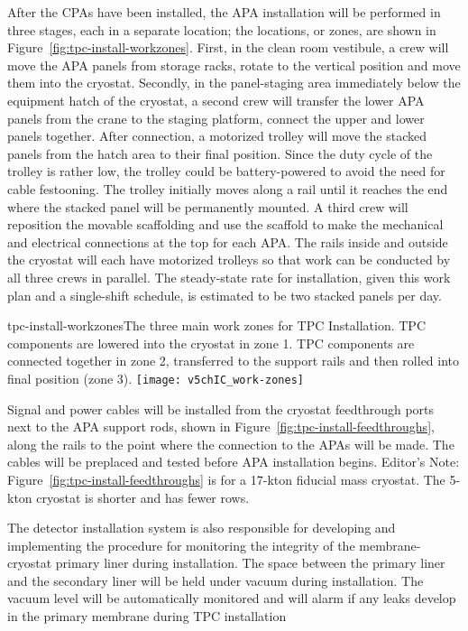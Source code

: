 After the CPAs have been installed, the APA installation will be performed in three stages, each in a separate location; the locations, or zones, are shown in Figure~\ref{fig:tpc-install-workzones}. First, in the clean room vestibule, a crew will move the APA panels from storage 
racks, rotate to the vertical position and move them into the cryostat. Secondly, in the panel-staging area immediately below the equipment hatch of the cryostat, a second crew will transfer the lower APA panels from the 
crane to the staging platform, connect the upper and lower panels together. After connection, a motorized trolley will move the stacked panels from the hatch area to their final position. Since the duty cycle of the trolley is rather low, the trolley could be battery-powered to 
avoid the need for cable festooning. The trolley initially moves along a rail until it reaches the end where the stacked panel will be permanently mounted. A third 
crew will reposition the movable scaffolding and use the scaffold to make the mechanical and electrical connections at the top for each APA. The rails inside and outside 
the cryostat will each have motorized trolleys so that work can be conducted by all three crews in parallel. The steady-state rate for installation, given this work plan and a single-shift schedule, is estimated to be two stacked panels per day. 

\begin{cdrfigure}{tpc-install-workzones}{The three main work zones for TPC Installation. TPC components are lowered into the cryostat in zone 1. TPC components are connected together in zone 2, 
transferred to the support rails and then rolled into final position (zone 3).}
\texttt{[image: v5chIC\_work-zones]}
\end{cdrfigure}

Signal and power cables will be installed from the cryostat feedthrough ports next to the APA support rods, shown in Figure~\ref{fig:tpc-install-feedthroughs}, along the rails to the point where the connection to the APAs will be made. The cables will be 
preplaced and tested before APA installation begins.  Editor’s Note: Figure~\ref{fig:tpc-install-feedthroughs} is for a 17-kton fiducial mass cryostat. The 5-kton cryostat is shorter and has fewer rows.  


The detector installation system is also responsible for developing and implementing the procedure for monitoring the integrity of the membrane-cryostat primary liner during installation. The space between the 
primary liner and the secondary liner will be held under vacuum during installation. The vacuum level will be automatically monitored and will alarm if any leaks develop in the primary membrane during TPC installation

